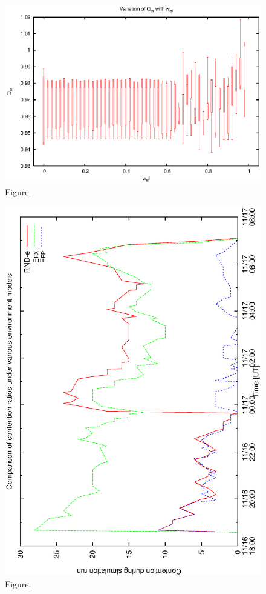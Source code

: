 \documentclass[12pt,a4paper]{article}
\begin{document}
\begin{figure}[htbp]
 \begin{center}
  \includegraphics[scale=1.0, angle=0]{figures/cmp_xt.eps}
 \end{center}
  \caption[Figure.]
{Figure.}
\end{figure}
\clearpage
\begin{figure}[htbp]
 \begin{center}
  \includegraphics[scale=1.0, angle=0]{figures/cont_1.eps}
 \end{center}
  \caption[Figure.]
{Figure.}
\end{figure}
\end{document}
